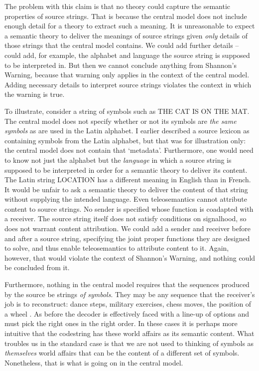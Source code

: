 The problem with this claim is that no theory could capture the semantic properties of source strings.
That is because the central model does not include enough detail for a theory to extract such a meaning.
It is unreasonable to expect a semantic theory to deliver the meanings of source strings given \textit{only} details of those strings that the central model contains.
We could add further details -- could add, for example, the alphabet and language the source string is supposed to be interpreted in.
But then we cannot conclude anything from {\sc Shannon's Warning}, because that warning only applies in the context of the central model.
Adding necessary details to interpret source strings violates the context in which the warning is true.

To illustrate, consider a string of symbols such as {\sc THE CAT IS ON THE MAT}.
The central model does not specify whether or not its symbols are \textit{the same symbols} as are used in the Latin alphabet.
I earlier described a source lexicon as containing symbols from the Latin alphabet, but that was for illustration only: the central model does not contain that `metadata'.
Furthermore, one would need to know not just the alphabet but the \textit{language} in which a source string is supposed to be interpreted in order for a semantic theory to deliver its content.
The Latin string {\sc LOCATION} has a different meaning in English than in French.
It would be unfair to ask a semantic theory to deliver the content of that string without supplying the intended language.
Even teleosemantics cannot attribute content to source strings.
No sender is specified whose function is coadapted with a receiver.
The source string itself does not satisfy conditions on signalhood, so does not warrant content attribution.
We could add a sender and receiver before and after a source string, specifying the joint proper functions they are designed to solve, and thus enable teleosemantics to attribute content to it.
Again, however, that would violate the context of {\sc Shannon's Warning}, and nothing could be concluded from it.

Furthermore, nothing in the central model requires that the sequences produced by the source be strings \textit{of symbols}.
They may be any sequence that the receiver's job is to reconstruct: dance steps, military exercises, chess moves, the position of a wheel \citep[327]{shannon1959coding}.
As before the decoder is effectively faced with a line-up of options and must pick the right ones in the right order.
In these cases it is perhaps more intuitive that the codestring has these world affairs as its semantic content.
What troubles us in the standard case is that we are not used to thinking of symbols as \textit{themselves} world affairs that can be the content of a different set of symbols.
Nonetheless, that is what is going on in the central model.

